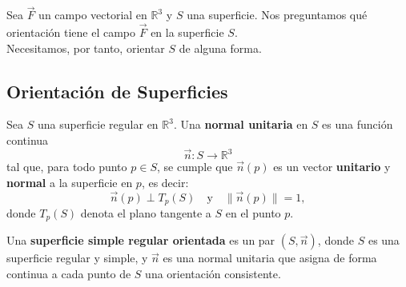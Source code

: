 
Sea $\vec{F}$ un campo vectorial en $\mathbb{R}^3$ y $S$ una superficie. Nos
preguntamos qué orientación tiene el campo $\vec{F}$ en la superficie $S$.\\
Necesitamos, por tanto, orientar $S$ de alguna forma.

\subsection{Orientación de Superficies}

\begin{definición} 
Sea \( S \) una superficie regular en \( \mathbb{R}^3 \). Una \textbf{normal unitaria} en \( S \) es una función continua
\[
    \vec{n}: S \to \mathbb{R}^3
\]
tal que, para todo punto \( p \in S \), se cumple que \( \vec{n}(p) \) es un
vector \textbf{unitario} y \textbf{normal} a la superficie en \( p \), es
decir:
\[
    \vec{n}(p) \perp T_p(S) \quad \text{y} \quad \|\vec{n}(p)\| = 1,
\]
donde \( T_p(S) \) denota el plano tangente a \( S \) en el punto \( p \).
\end{definición}

\begin{definición} 
Una \textbf{superficie simple regular orientada} es un par \( (S, \vec{n}) \), donde \( S \) es una superficie regular y simple, y \( \vec{n} \) es una normal unitaria que asigna de forma continua a cada punto de \( S \) una orientación consistente.
\end{definición}

